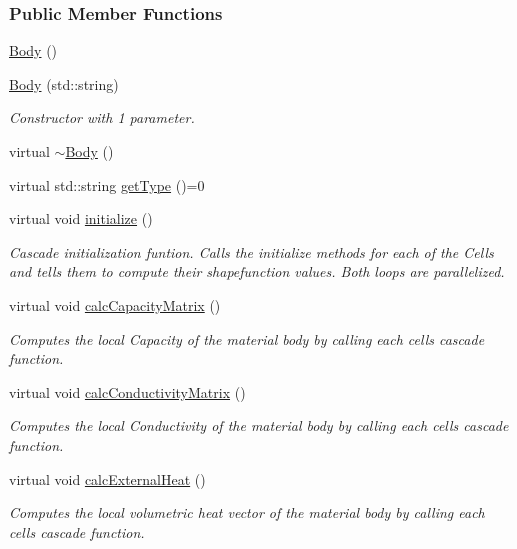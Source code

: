 \subsubsection*{Public Member Functions}
\begin{DoxyCompactItemize}
\item 
\hyperlink{classmknix_1_1_body_a5f11ba30f14169c567d8e3f84afbbf40}{Body} ()
\item 
\hyperlink{classmknix_1_1_body_a121c49df553ac35ca246052168eccb7f}{Body} (std\+::string)
\begin{DoxyCompactList}\small\item\em Constructor with 1 parameter. \end{DoxyCompactList}\item 
virtual \hyperlink{classmknix_1_1_body_ad58a0a50a821e1adaa5abd1320e5a837}{$\sim$\+Body} ()
\item 
virtual std\+::string \hyperlink{classmknix_1_1_body_a603ed0a11eee91957b2655a0e4667cd4}{get\+Type} ()=0
\item 
virtual void \hyperlink{classmknix_1_1_body_a054b7576fbd1e8c39f02105b8572c372}{initialize} ()
\begin{DoxyCompactList}\small\item\em Cascade initialization funtion. Calls the initialize methods for each of the Cells and tells them to compute their shapefunction values. Both loops are parallelized. \end{DoxyCompactList}\item 
virtual void \hyperlink{classmknix_1_1_body_acd598d48de1ed25dbbf11a438154f3d9}{calc\+Capacity\+Matrix} ()
\begin{DoxyCompactList}\small\item\em Computes the local Capacity of the material body by calling each cell\textquotesingle{}s cascade function. \end{DoxyCompactList}\item 
virtual void \hyperlink{classmknix_1_1_body_af3b11d33d15d6b2411bca681ddd10b9c}{calc\+Conductivity\+Matrix} ()
\begin{DoxyCompactList}\small\item\em Computes the local Conductivity of the material body by calling each cell\textquotesingle{}s cascade function. \end{DoxyCompactList}\item 
virtual void \hyperlink{classmknix_1_1_body_a2251d4224fdaeef6c78ee3edce4d94fe}{calc\+External\+Heat} ()
\begin{DoxyCompactList}\small\item\em Computes the local volumetric heat vector of the material body by calling each cell\textquotesingle{}s cascade function. \end{DoxyCompactList}\item 

\end{DoxyCompactItemize}
